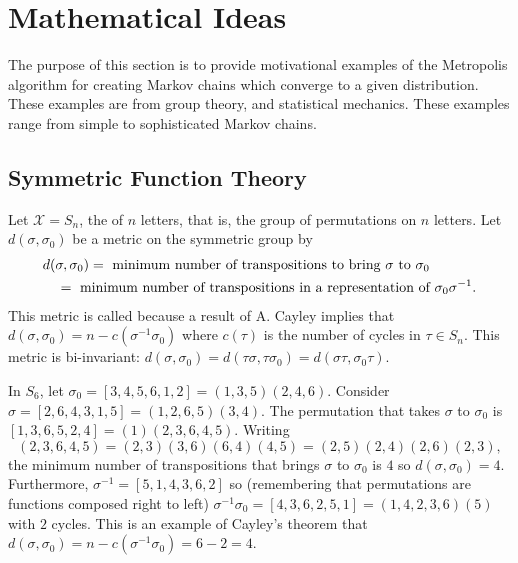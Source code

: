 \documentclass[12pt]{article}
\begin{document}
\section*{Mathematical Ideas}

The purpose of this section is to provide motivational examples of the
Metropolis algorithm for creating Markov chains which converge to a
given distribution.  These examples are from group theory, and
statistical mechanics.  These examples range from simple to
sophisticated Markov chains.

\subsection*{Symmetric Function Theory}

Let \( \mathcal{X} = S_n \), the  of \( n \)
letters, that is, the group of permutations on \( n \) letters.%
Let \( d(\sigma, \sigma_0) \) be a metric on the symmetric group by
\begin{align*}
    &d(\sigma, \sigma_0) = \text{ minimum number of transpositions
    to bring \( \sigma \) to \( \sigma_{0} \)} \\
    &\quad = \text{ minimum number of transpositions in a representation
    of \( \sigma_{0} \sigma^{-1} \)}.
\end{align*}
This metric is called %
because a result of A. Cayley implies that \( d(\sigma, \sigma_0) = n -
c(\sigma^{-1} \sigma_0) \) where \( c(\tau) \) is the number of cycles
in \( \tau \in S_n \).  This metric is bi-invariant:  \( d(\sigma,
\sigma_0) = d(\tau \sigma, \tau \sigma_0) = d(\sigma \tau, \sigma_0 \tau)
\).


\begin{example}
    In \( S_6 \), let \( \sigma_0 = [3,4,5,6,1,2] = (1, 3, 5)(2, 4, 6) \).
    Consider \( \sigma=[2,6,4,3,1,5] = (1, 2, 6, 5)(3, 4) \).  The
    permutation that takes \( \sigma \) to \( \sigma_0 \) is \( [1,3,6,5,2,4]
    = (1)(2, 3, 6, 4, 5) \).  Writing
    \[
      (2, 3, 6, 4, 5) = (2, 3)(3, 6)(6,4)(4, 5) = (2, 5)(2, 4)(2, 6)(2, 3),
    \] the minimum number of
    transpositions that brings \( \sigma \) to \( \sigma_0 \) is \( 4 \)
    so \( d(\sigma, \sigma_0) = 4 \).  Furthermore, \( \sigma^{-1} = [5,1,4,3,6,2]
    \) so (remembering that permutations are functions composed right to
    left) \( \sigma^{-1} \sigma_0 = [4,3,6,2,5,1] = (1, 4, 2, 3, 6)(5) \)
    with \( 2 \) cycles.  This is an example of Cayley's theorem that \(
    d(\sigma, \sigma_0) = n - c(\sigma^{-1} \sigma_0) = 6-2 = 4 \).
\end{example}
\end{document}
